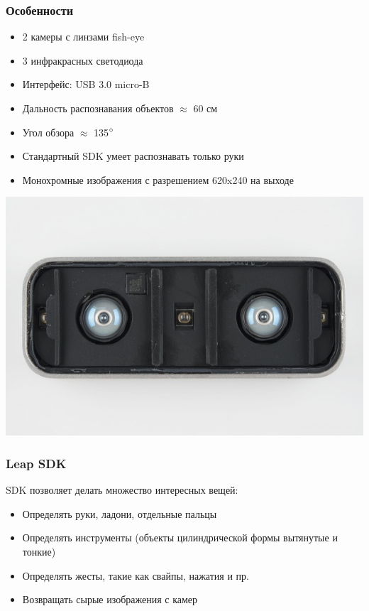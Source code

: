 \documentclass{beamer}
\begin{document}
		\begin{frame}
			\frametitle{Особенности}
			
			\begin{itemize}
				\item 2 камеры с линзами fish-eye
				\item 3 инфракрасных светодиода
				\item Интерфейс: USB 3.0 micro-B
				\item Дальность распознавания объектов $\approx$ 60 см
				\item Угол обзора $\approx$ 135$\degree$
				\item Стандартный SDK умеет распознавать только руки
				\item Монохромные изображения с разрешением 620x240 на выходе
			\end{itemize}
			
			\begin{center}
				\includegraphics[scale=0.25]{LeapMotionDisassembled}
			\end{center}
		\end{frame}
		
		\begin{frame}
			\frametitle{Leap SDK}
			
			SDK позволяет делать множество интересных вещей:
			\begin{itemize}
				\item Определять руки, ладони, отдельные пальцы
				\item Определять инструменты (объекты цилиндрической формы вытянутые и тонкие)
				\item Определять жесты, такие как свайпы, нажатия и пр.
				\item Возвращать сырые изображения с камер
			\end{itemize}
		\end{frame}
		
\end{document}
